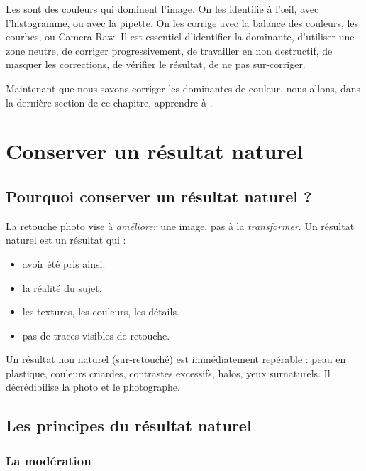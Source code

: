 Les  sont des couleurs qui dominent l'image. On les identifie à l'œil, avec l'histogramme, ou avec la pipette. On les corrige avec la balance des couleurs, les courbes, ou Camera Raw. Il est essentiel d'identifier la dominante, d'utiliser une zone neutre, de corriger progressivement, de travailler en non destructif, de masquer les corrections, de vérifier le résultat, de ne pas sur-corriger.

Maintenant que nous savons corriger les dominantes de couleur, nous allons, dans la dernière section de ce chapitre, apprendre à .

\section{Conserver un résultat naturel}

\subsection{Pourquoi conserver un résultat naturel ?}

La retouche photo vise à \emph{améliorer} une image, pas à la \emph{transformer}. Un résultat naturel est un résultat qui :

\begin{itemize}
    \item {} avoir été pris ainsi.
    \item {} la réalité du sujet.
    \item {} les textures, les couleurs, les détails.
    \item {} pas de traces visibles de retouche.
\end{itemize}

Un résultat non naturel (sur-retouché) est immédiatement repérable : peau en plastique, couleurs criardes, contrastes excessifs, halos, yeux surnaturels. Il décrédibilise la photo et le photographe.

\subsection{Les principes du résultat naturel}

\subsubsection{La modération}

